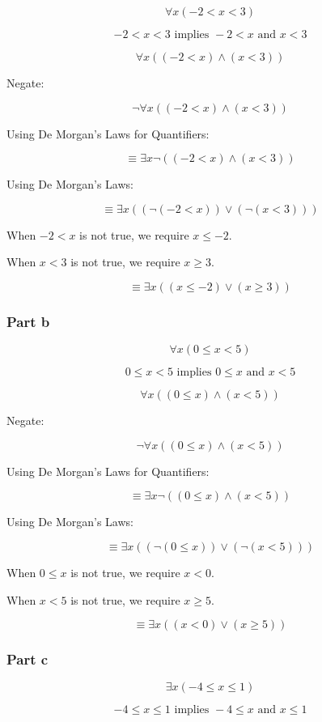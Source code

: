 \documentclass[12pt]{article}
\begin{document}
\[
\forall x(-2 < x < 3)
\]

\[
-2 < x < 3 \text{ implies } -2 < x \text{ and } x < 3
\]

\[
\forall x((-2 < x) \land (x < 3))
\]

Negate:

\[
\neg \forall x((-2 < x) \land (x < 3))
\]

Using De Morgan's Laws for Quantifiers:

\[
\equiv \exists x \neg ((-2 < x) \land (x < 3))
\]

Using De Morgan's Laws:

\[
\equiv \exists x ((\neg (-2 < x)) \lor (\neg (x < 3)))
\]

When \( -2 < x \) is not true, we require \( x \leq -2 \).

When \( x < 3 \) is not true, we require \( x \geq 3 \).

\[
\equiv \exists x ((x \leq -2) \lor (x \geq 3))
\]

\subsubsection*{Part b}

\[
\forall x (0 \leq x < 5)
\]

\[
0 \leq x < 5 \text{ implies } 0 \leq x \text{ and } x < 5
\]

\[
\forall x ((0 \leq x) \land (x < 5))
\]

Negate:

\[
\neg \forall x ((0 \leq x) \land (x < 5))
\]

Using De Morgan's Laws for Quantifiers:

\[
\equiv \exists x \neg ((0 \leq x) \land (x < 5))
\]

Using De Morgan's Laws:

\[
\equiv \exists x ((\neg (0 \leq x)) \lor (\neg (x < 5)))
\]

When \( 0 \leq x \) is not true, we require \( x < 0 \).

When \( x < 5 \) is not true, we require \( x \geq 5 \).

\[
\equiv \exists x ((x < 0) \lor (x \geq 5))
\]

\subsubsection*{Part c}

\[
\exists x (-4 \leq x \leq 1)
\]

\[
-4 \leq x \leq 1 \text{ implies } -4 \leq x \text{ and } x \leq 1
\]
\end{document}
